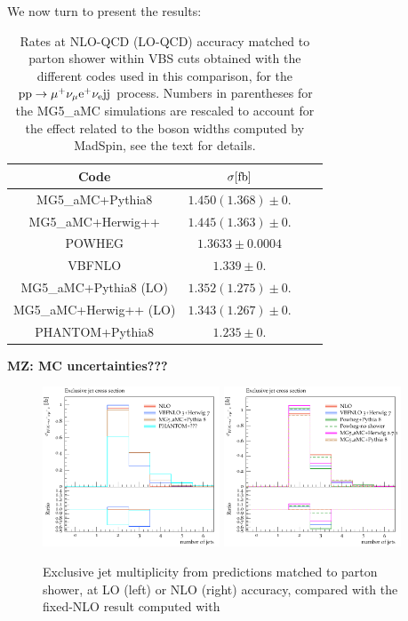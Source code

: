 We now turn to present the results:



\begin{table}[h!]
    \centering
    \begin{tabular}{c|c|c|c}
        Code  &  $\sigma[\rm{fb}]$  \\
        \hline
        {\sc MG5\_aMC}+{\sc Pythia8}&  $1.450 (1.368) \pm 0.$  \\
        {\sc MG5\_aMC}+{\sc Herwig++}&  $1.445 (1.363) \pm 0.$  \\
        {\sc POWHEG}  &  $1.3633 \pm 0.0004$  \\
        {\sc VBFNLO}  &  $1.339 \pm 0.$  \\
        \hline
        {\sc MG5\_aMC}+{\sc Pythia8} (LO)&  $1.352 (1.275) \pm 0.$  \\
        {\sc MG5\_aMC}+{\sc Herwig++} (LO)&  $1.343 (1.267)  \pm 0.$  \\
        {\sc PHANTOM}+{\sc Pythia8} &  $1.235  \pm 0.$  \\
    \end{tabular}
    \caption{\label{tab:wg1_NLOrates} Rates at NLO-QCD (LO-QCD) accuracy matched to parton shower within VBS cuts obtained with the different codes used in this comparison, 
    for the ${\rm p}{\rm p}\to\mu^+\nu_\mu{\rm e}^+\nu_{\rm e}{\rm j}{\rm j}$ process. Numbers in parentheses for the {\sc MG5\_aMC} simulations
    are rescaled to account for the effect related to the boson widths computed by {\sc MadSpin}, see the text for details.}
{\bf MZ: MC uncertainties???}
\end{table}

\begin{figure}[hbt]
\centering
\includegraphics[width=0.47\textwidth]{figures/LOPS/jetsexclusive.pdf}
\includegraphics[width=0.47\textwidth]{figures/NLOPS/jetsexclusive.pdf}
\caption{Exclusive jet multiplicity from predictions matched to parton shower, at LO (left) or NLO (right) accuracy, compared with the fixed-NLO result
    computed with }
\label{fig:PSnjet}
\end{figure}

